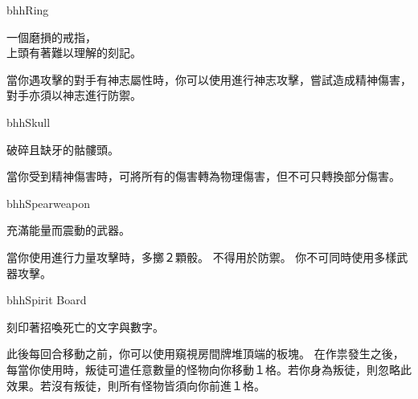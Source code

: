 \linebreak[0]%
\begin{OmenCard}{bhh}{Ring}{}
  \begin{CardStory}
    一個磨損的戒指，\\
    上頭有著難以理解的刻記。
  \end{CardStory}
  當你遇攻擊的對手有神志屬性時，你可以使用\ThisName{}進行神志攻擊，嘗試造成精神傷害，對手亦須以神志進行防禦。\smallbreak
\end{OmenCard}%
\linebreak[0]%
\begin{OmenCard}{bhh}{Skull}{}
  \begin{CardStory}
    破碎且缺牙的骷髏頭。
  \end{CardStory}
  當你受到精神傷害時，可將所有的傷害轉為物理傷害，但不可只轉換部分傷害。\smallbreak
\end{OmenCard}%
\linebreak[0]%
\begin{OmenCard}{bhh}{Spear}{weapon}
  \begin{CardStory}
    充滿能量而震動的武器。
  \end{CardStory}
  當你使用\ThisName{}進行力量攻擊時，多擲２顆骰。\smallbreak
  \ThisName{}不得用於防禦。\smallbreak
  你不可同時使用多樣武器攻擊。\smallbreak
\end{OmenCard}%
\linebreak[0]%
\begin{OmenCard}{bhh}{Spirit Board}{}
  \begin{CardStory}
    刻印著招喚死亡的文字與數字。
  \end{CardStory}
  此後每回合移動之前，你可以使用\ThisName{}窺視房間牌堆頂端的板塊。\smallbreak
  在作祟發生之後，每當你使用\ThisName{}時，叛徒可遣任意數量的怪物向你移動１格。若你身為叛徒，則忽略此效果。若沒有叛徒，則所有怪物皆須向你前進１格。\smallbreak
\end{OmenCard}%
